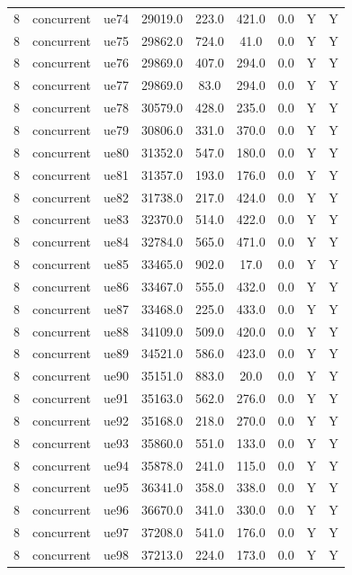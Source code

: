 \begin{table}[ht]
\begin{tabular}{|c|c|c|c|c|c|c|c|c|}
8 & concurrent & ue74 & 29019.0 & 223.0 & 421.0 & 0.0 & Y & Y \\
8 & concurrent & ue75 & 29862.0 & 724.0 & 41.0 & 0.0 & Y & Y \\
8 & concurrent & ue76 & 29869.0 & 407.0 & 294.0 & 0.0 & Y & Y \\
8 & concurrent & ue77 & 29869.0 & 83.0 & 294.0 & 0.0 & Y & Y \\
8 & concurrent & ue78 & 30579.0 & 428.0 & 235.0 & 0.0 & Y & Y \\
8 & concurrent & ue79 & 30806.0 & 331.0 & 370.0 & 0.0 & Y & Y \\
8 & concurrent & ue80 & 31352.0 & 547.0 & 180.0 & 0.0 & Y & Y \\
8 & concurrent & ue81 & 31357.0 & 193.0 & 176.0 & 0.0 & Y & Y \\
8 & concurrent & ue82 & 31738.0 & 217.0 & 424.0 & 0.0 & Y & Y \\
8 & concurrent & ue83 & 32370.0 & 514.0 & 422.0 & 0.0 & Y & Y \\
8 & concurrent & ue84 & 32784.0 & 565.0 & 471.0 & 0.0 & Y & Y \\
8 & concurrent & ue85 & 33465.0 & 902.0 & 17.0 & 0.0 & Y & Y \\
8 & concurrent & ue86 & 33467.0 & 555.0 & 432.0 & 0.0 & Y & Y \\
8 & concurrent & ue87 & 33468.0 & 225.0 & 433.0 & 0.0 & Y & Y \\
8 & concurrent & ue88 & 34109.0 & 509.0 & 420.0 & 0.0 & Y & Y \\
8 & concurrent & ue89 & 34521.0 & 586.0 & 423.0 & 0.0 & Y & Y \\
8 & concurrent & ue90 & 35151.0 & 883.0 & 20.0 & 0.0 & Y & Y \\
8 & concurrent & ue91 & 35163.0 & 562.0 & 276.0 & 0.0 & Y & Y \\
8 & concurrent & ue92 & 35168.0 & 218.0 & 270.0 & 0.0 & Y & Y \\
8 & concurrent & ue93 & 35860.0 & 551.0 & 133.0 & 0.0 & Y & Y \\
8 & concurrent & ue94 & 35878.0 & 241.0 & 115.0 & 0.0 & Y & Y \\
8 & concurrent & ue95 & 36341.0 & 358.0 & 338.0 & 0.0 & Y & Y \\
8 & concurrent & ue96 & 36670.0 & 341.0 & 330.0 & 0.0 & Y & Y \\
8 & concurrent & ue97 & 37208.0 & 541.0 & 176.0 & 0.0 & Y & Y \\
8 & concurrent & ue98 & 37213.0 & 224.0 & 173.0 & 0.0 & Y & Y \\

\end{tabular}
\end{table}
